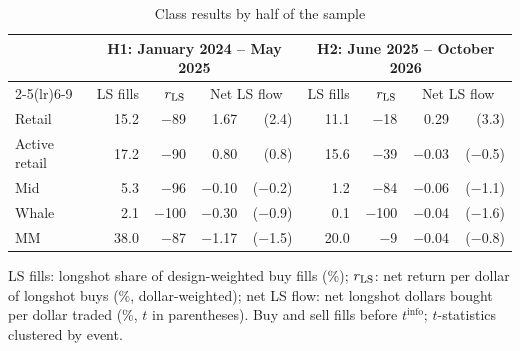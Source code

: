 \begin{table}[t]
\centering
\small
\begin{threeparttable}
\caption{Class results by half of the sample}\label{tab:wallets-halves}
\begin{tabular}{lrrrrrrrr}
\toprule
& \multicolumn{4}{c}{H1: January 2024 -- May 2025} & \multicolumn{4}{c}{H2: June 2025 -- October 2026} \\
\cmidrule(lr){2-5}\cmidrule(lr){6-9}
& LS fills & $r_{\text{LS}}$ & \multicolumn{2}{c}{Net LS flow} & LS fills & $r_{\text{LS}}$ & \multicolumn{2}{c}{Net LS flow} \\
\midrule
Retail & 15.2 & $-$89 & 1.67 & (2.4) & 11.1 & $-$18 & 0.29 & (3.3) \\
Active retail & 17.2 & $-$90 & 0.80 & (0.8) & 15.6 & $-$39 & $-$0.03 & ($-$0.5) \\
Mid & 5.3 & $-$96 & $-$0.10 & ($-$0.2) & 1.2 & $-$84 & $-$0.06 & ($-$1.1) \\
Whale & 2.1 & $-$100 & $-$0.30 & ($-$0.9) & 0.1 & $-$100 & $-$0.04 & ($-$1.6) \\
MM & 38.0 & $-$87 & $-$1.17 & ($-$1.5) & 20.0 & $-$9 & $-$0.04 & ($-$0.8) \\
\bottomrule
\end{tabular}
\begin{tablenotes}\footnotesize
\item LS fills: longshot share of design-weighted buy fills (\%); $r_{\text{LS}}$: net return per dollar of longshot buys
  (\%, dollar-weighted); net LS flow: net longshot dollars bought per dollar traded (\%, $t$ in parentheses).
  Buy and sell fills before $t^{\mathrm{info}}$; $t$-statistics clustered by event.
\end{tablenotes}
\end{threeparttable}
\end{table}

